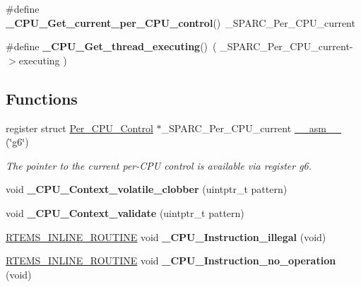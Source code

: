 \begin{DoxyCompactItemize}
\item 
\mbox{\label{group__RTEMSScoreCPUSPARC_ga026af6cb089314aa4eac9e276624953e}} 
\#define {\bfseries \+\_\+\+C\+P\+U\+\_\+\+Get\+\_\+current\+\_\+per\+\_\+\+C\+P\+U\+\_\+control}()~\+\_\+\+S\+P\+A\+R\+C\+\_\+\+Per\+\_\+\+C\+P\+U\+\_\+current
\item 
\mbox{\label{group__RTEMSScoreCPUSPARC_gadcdca3586eca8c4286b18312eac9087f}} 
\#define {\bfseries \+\_\+\+C\+P\+U\+\_\+\+Get\+\_\+thread\+\_\+executing}()~( \+\_\+\+S\+P\+A\+R\+C\+\_\+\+Per\+\_\+\+C\+P\+U\+\_\+current-\/$>$executing )
\end{DoxyCompactItemize}
\subsection*{Functions}
\begin{DoxyCompactItemize}
\item 
\mbox{\label{group__RTEMSScoreCPUSPARC_ga82257d4fc068f4b21b029dd69d276839}} 
register struct \mbox{\hyperlink{structPer__CPU__Control}{Per\+\_\+\+C\+P\+U\+\_\+\+Control}} $\ast$\+\_\+\+S\+P\+A\+R\+C\+\_\+\+Per\+\_\+\+C\+P\+U\+\_\+current \mbox{\hyperlink{group__RTEMSScoreCPUSPARC_ga82257d4fc068f4b21b029dd69d276839}{\+\_\+\+\_\+asm\+\_\+\+\_\+}} (\char`\"{}g6\char`\"{})
\begin{DoxyCompactList}\small\item\em The pointer to the current per-\/\+C\+PU control is available via register g6. \end{DoxyCompactList}\item 
\mbox{\label{group__RTEMSScoreCPUSPARC_gad26becade17fbdbb0bdf63c6b9228688}} 
void {\bfseries \+\_\+\+C\+P\+U\+\_\+\+Context\+\_\+volatile\+\_\+clobber} (uintptr\+\_\+t pattern)
\item 
\mbox{\label{group__RTEMSScoreCPUSPARC_ga3adb94b8d32fd0e3058934ffd3df6d90}} 
void {\bfseries \+\_\+\+C\+P\+U\+\_\+\+Context\+\_\+validate} (uintptr\+\_\+t pattern)
\item 
\mbox{\label{group__RTEMSScoreCPUSPARC_ga07618c93359f2485af2e98a96b330208}} 
\mbox{\hyperlink{group__RTEMSScoreBaseDefs_gac216239df231d5dbd15e3520b0b9313f}{R\+T\+E\+M\+S\+\_\+\+I\+N\+L\+I\+N\+E\+\_\+\+R\+O\+U\+T\+I\+NE}} void {\bfseries \+\_\+\+C\+P\+U\+\_\+\+Instruction\+\_\+illegal} (void)
\item 
\mbox{\label{group__RTEMSScoreCPUSPARC_gab683a0a37a089e2a0fd3c356836d5499}} 
\mbox{\hyperlink{group__RTEMSScoreBaseDefs_gac216239df231d5dbd15e3520b0b9313f}{R\+T\+E\+M\+S\+\_\+\+I\+N\+L\+I\+N\+E\+\_\+\+R\+O\+U\+T\+I\+NE}} void {\bfseries \+\_\+\+C\+P\+U\+\_\+\+Instruction\+\_\+no\+\_\+operation} (void)
\end{DoxyCompactItemize}


